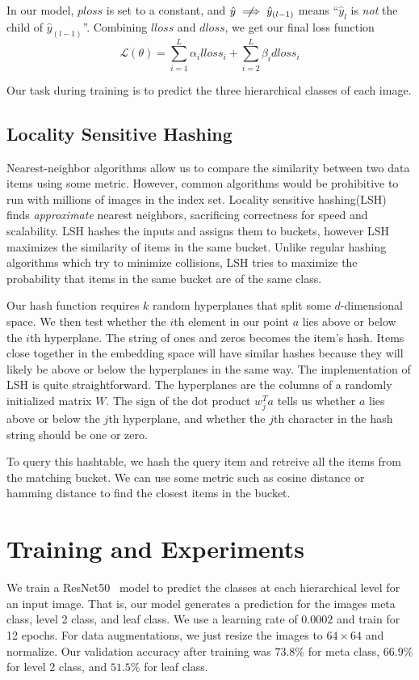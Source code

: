 \documentclass[conference]{IEEEtran}
\begin{document}
In our model, $ploss$ is set to a constant, and $\hat{y}\centernot\implies\hat{y}_{(l-1)}$ means
``$\hat{y}_l$ is \emph{not} the child of $\hat{y}_{(l-1)}$''.
Combining $lloss$ and $dloss$, we get our final loss function
\begin{equation}
		\mathcal{L}(\theta) = \sum_{i=1}^{L}\alpha_i lloss_i + \sum_{i=2}^{L}\beta_i dloss_{i}
		\label{eq:loss}
\end{equation}

Our task during training is to predict the three hierarchical classes of each image.

\subsection{Locality Sensitive Hashing}
Nearest-neighbor algorithms allow us to compare the similarity between two data items using some 
metric.
However, common algorithms would be prohibitive to run with millions of images in the index set.
Locality sensitive hashing(LSH)~\cite{rajaraman2011mining}~\cite{agrawal2019finding}~\cite{yona2018fast}~\cite{gupta2018locality}
finds \emph{approximate} nearest neighbors, sacrificing correctness for speed and scalability.
LSH hashes the inputs and assigns them to buckets, however LSH maximizes
the similarity of items in the same bucket.
Unlike regular hashing algorithms which try to minimize collisions, 
LSH tries to maximize the probability that items in the same bucket are of the 
same class.

Our hash function requires $k$ random hyperplanes that split some $d$-dimensional
space.
We then test whether the $i$th element in our point $a$ lies above or below the
$i$th hyperplane.
The string of ones and zeros becomes the item's hash.
Items close together in the embedding space will have similar hashes because they will
likely be above or below the hyperplanes in the same way.
The implementation of LSH is quite straightforward.
The hyperplanes are the columns of a randomly initialized matrix $W$.
The sign of the dot product $w_{j}^Ta$ tells us whether $a$ lies above
or below the $j$th hyperplane, and whether the $j$th character in the hash
string should be one or zero.

To query this hashtable, we hash the query item and retreive
all the items from the matching bucket.
We can use some metric such as cosine distance or hamming distance
to find the closest items in the bucket.

\section{Training and Experiments}
\label{sec:training}
We train a ResNet50~\cite{he2016deep} model to predict the classes at each 
hierarchical level for an input image.
That is, our model generates a prediction for the images meta class, level 2
class, and leaf class.
We use a learning rate of $0.0002$ and train for 12 epochs.
For data augmentations, we just resize the images to $64\times64$ and 
normalize.
Our validation accuracy after training was $73.8\%$ for meta class,
$66.9\%$ for level 2 class, and $51.5\%$ for leaf class.
\end{document}
